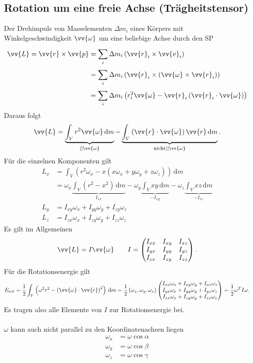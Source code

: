\documentclass[a4paper,12pt]{article}
\newcommand{\td}{\,\text{d}}
\numberwithin{equation}{section}
\begin{document}
\subsection{Rotation um eine freie Achse (Trägheitstensor)}
Der Drehimpuls von Masselementen $\Delta m_i$ eines Körpers mit Winkelgeschwindigkeit $\vv{\omega }$ um eine beliebige Achse durch den SP
\begin{align*}
        \vv{L}=\vv{r}\times \vv{p}&=\sum_{i}^{}\Delta m_i\left(\vv{r}_i\times \vv{v}_i\right)\\
                                  &=\sum_{i}^{}\Delta m_i\left(\vv{r}_i\times\left(\vv{\omega }\times \vv{r}_i\right)\right)\\
                                  &=\sum_{i}^{}\Delta m_i\left(r_i^2\vv{\omega }-\vv{r}_i\left(\vv{r}_i\cdot \vv{\omega }\right)\right)
\end{align*}
Daraus folgt
\[ 
        \vv{L}=\underbrace{\int_{V}^{}r^2\vv{\omega }\td m}_{||\vv{\omega }}-\underbrace{\int_{V}^{}\left(\vv{r}\cdot \vv{\omega }\right)\vv{r}\td m}_{\text{nicht}||\vv{\omega }}
.\] 
Für die einzelnen Komponenten gilt
\begin{align*}
        L_x&=\int_{V}^{}\left(r^2\omega _x-x\left(x\omega _x+y\omega _y+z\omega _z\right)\right)\td m\\
           &=\omega _x\underbrace{\int_{V}^{}\left(r^2-x^2\right)\td m}_{I_{xx}}-\omega _y\underbrace{\int_{V}^{}xy\td m}_{-I_{xy}}-\omega _z\underbrace{\int_{V}^{}xz\td m}_{-I_{xz}}\\
        L_y&=I_{xy}\omega _x+I_{yy}\omega _y+I_{zy}\omega _z\\
        L_z&=I_{zx}\omega _x+I_{zy}\omega _y+I_{zz}\omega _z
\end{align*}
Es gilt im Allgemeinen
\[ 
        \vv{L}=I\vv{\omega }\qquad I=\left(\begin{matrix}
                        I_{xx}&I_{xy}&I_{xz}\\I_{yx}&I_{yy}&I_{yz}\\I_{zx}&I_{zy}&I_{zz}
        \end{matrix}\right)
.\] 
Für die Rotationsenergie gilt
\[ 
        E_{\text{rot}}=\dfrac{1}{2}\int_{V}^{}\left(\omega ^2r^2-\left(\vv{\omega }\cdot \vv{r}\right)^2\right)\td m=\dfrac{1}{2}\left(\omega _x,\omega _y,\omega _z\right)\left(\begin{matrix}
                        I_{xx}\omega _x+I_{xy}\omega _y+I_{xz}\omega _z\\
                        I_{yx}\omega _x+I_{yy}\omega _y+I_{yz}\omega _z\\
                        I_{zx}\omega _x+I_{zy}\omega _y+I_{zz}\omega _z
        \end{matrix}\right)=\dfrac{1}{2}\omega ^TI\omega 
.\] 
Es tragen also alle Elemente von $I$ zur Rotationsenergie bei.\\\\
$\omega $ kann auch nicht parallel zu den Koordinatenachsen liegen
\begin{align*} %
        \omega _x&=\omega \cos \alpha \\
        \omega _y&=\omega \cos \beta \\
        \omega _z&=\omega \cos \gamma 
\end{align*}
\end{document}
